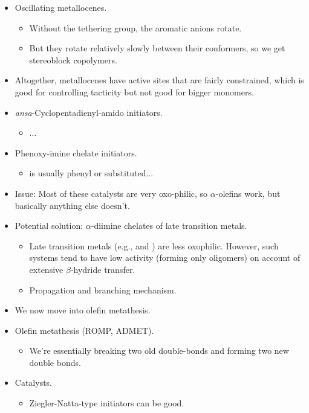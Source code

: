 \documentclass[../notes.tex]{subfiles}
\begin{document}
\begin{itemize}
\begin{itemize}
    \end{itemize}
    \item Oscillating metallocenes.
    \begin{itemize}
        \item Without the tethering group, the aromatic anions rotate.
        \item But they rotate relatively slowly between their conformers, so we get stereoblock copolymers.
    \end{itemize}
    \item Altogether, metallocenes have active sites that are fairly constrained, which is good for controlling tacticity but not good for bigger monomers.
    \item \emph{ansa}-Cyclopentadienyl-amido initiators.
    \begin{itemize}
        \item ...
    \end{itemize}
    \item Phenoxy-imine chelate initiators.
    \begin{itemize}
        \item {} is usually phenyl or substituted...
    \end{itemize}
    \item Issue: Most of these catalysts are very oxo-philic, so $\alpha$-olefins work, but basically anything else doesn't.
    \item Potential solution: $\alpha$-diimine chelates of late transition metals.
    \begin{itemize}
        \item Late transition metals (e.g.,  and ) are less oxophilic. However, such systems tend to have low activity (forming only oligomers) on account of extensive $\beta$-hydride transfer.
        \item Propagation and branching mechanism.
    \end{itemize}
    \item We now move into olefin metathesis.
    \item Olefin metathesis (ROMP, ADMET).
    \begin{itemize}
        \item We're essentially breaking two old double-bonds and forming two new double bonds.
    \end{itemize}
    \item Catalysts.
    \begin{itemize}
        \item Ziegler-Natta-type initiators can be good.

\end{itemize}
\end{itemize}
\end{document}
